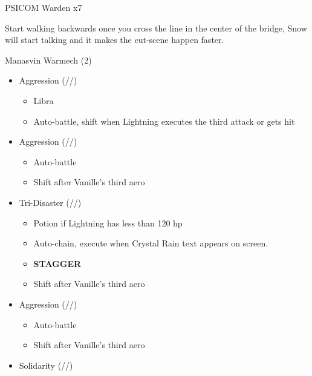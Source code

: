 \begin{paracol}{2}
\renewcommand{\first}{[1] Tri-Disaster (\rav/\rav/\rav)}

\renewcommand{\second}{[2] Solidarity (\com/\sen/\med)}

\renewcommand{\third}{[3] Aggression (\com/\com/\rav)}

\renewcommand{\fourth}{[4] Aggression (\com/\com/\rav)}
\switchcolumn*

	\begin{battle}{PSICOM Warden x7}
		 
	\end{battle}
	
	
	Start walking backwards once you cross the line in the center of the bridge, Snow will start talking and it makes the cut-scene happen faster.

	\begin{battle}{Manasvin Warmech (2)}
		\begin{itemize}
			\item \third
			      \begin{itemize}
				      \item Libra
				      \item Auto-battle, shift when Lightning executes the third attack or gets hit
			      \end{itemize}
			\item \fourth
			      \begin{itemize}
				      \item Auto-battle
				      \item Shift after Vanille's third aero
			      \end{itemize}
			\item \first
			      \begin{itemize}
				      \item Potion if Lightning has less than 120 hp
				      \item Auto-chain, execute when Crystal Rain text appears on screen.
				      \item \textbf{STAGGER}
				      \item Shift after Vanille's third aero
			      \end{itemize}
			\item \third
			      \begin{itemize}
				      \item Auto-battle
				      \item Shift after Vanille's third aero
			      \end{itemize}
			\item \second

\end{itemize}
\end{battle}
\end{paracol}
